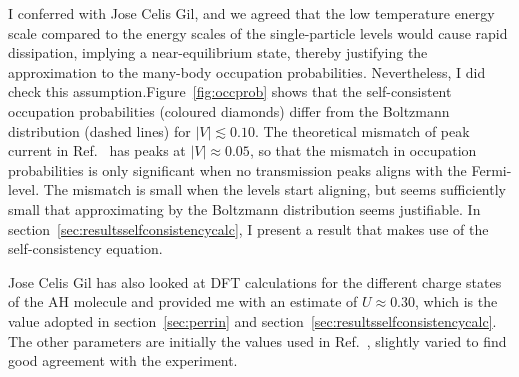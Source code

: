 I conferred with Jose Celis Gil, and we agreed that the low temperature energy scale compared to the energy scales of the single-particle levels would cause rapid dissipation, implying a near\hyp{}equilibrium state, thereby justifying the approximation to the many-body occupation probabilities. Nevertheless, I did check this assumption.Figure~\ref{fig:occprob} shows that the self-consistent occupation probabilities (coloured diamonds) differ from the Boltzmann distribution (dashed lines) for $\left|V\right|\lesssim 0.10$. The theoretical mismatch of peak current in Ref.~\cite{perrinnano} has peaks at $\left|V\right|\approx 0.05$, so that the mismatch in occupation probabilities is only significant when no transmission peaks aligns with the Fermi-level. The mismatch is small when the levels start aligning, but seems sufficiently small that approximating by the Boltzmann distribution seems justifiable. In section~\ref{sec:resultsselfconsistencycalc}, I present a result that makes use of the self-consistency equation.


Jose Celis Gil has also looked at DFT calculations for the different charge states of the AH molecule and provided me with an estimate of $U \approx 0.30$, which is the value adopted in section~\ref{sec:perrin} and section~\ref{sec:resultsselfconsistencycalc}. The other parameters are initially the values used in Ref.~\cite{perrinnano}, slightly varied to find good agreement with the experiment.

